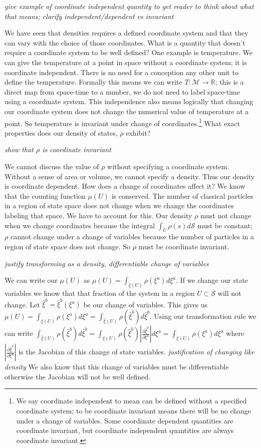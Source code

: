 \documentclass{article}
\begin{document}
\emph{give example of coordinate independent quantity to get reader to think about what that means; clarify independent/dependent vs invariant}

	We have seen that densities requires a defined coordinate system and that they can vary with the choice of those coordinates. What is a quantity that doesn't require a coordinate system to be well defined? One example is temperature. We can give the temperature at a point in space without a coordinate system; it is coordinate independent. There is no need for a conception any other unit to define the temperature. Formally this means we can write $T : \mathcal{M} \to \mathbb{R}$; this is a direct map from space-time to a number, we do not need to label space-time using a coordinate system. This independence also means logically that changing our coordinate system does not change the numerical value of temperature at a point. So temperature is invariant under change of coordinates.\footnote{We say coordinate independent to mean can be defined without a specified coordinate system; to be coordinate invariant means there will be no change under a change of variables. Some coordinate dependent quantities are coordinate invariant, but coordinate independent quantities are always coordinate invariant.} What exact properties does our density of states, $\rho$ exhibit?

	\emph{show that $\rho$ is coordinate invariant}
	
	We cannot discuss the value of $\rho$ without specifying a coordinate system. Without a sense of area or volume, we cannot specify a density. Thus our density is coordinate dependent. How does a change of coordinates affect it? We know that the counting function $\mu(U)$ is conserved. The number of classical particles in a region of state space does not change when we change the coordinates labeling that space. We have to account for this. Our density $\rho$ must not change when we change coordinates because the integral $\int_U \rho(s) d\mathcal{S}$ must be constant; $\rho$ cannot change under a change of variables because the number of particles in a region of state space does not change. So $\rho$ must be coordinate invariant.
	
	\emph{justify transforming as a density, differentiable change of variables}

	We can write our $\mu(U)$ as $\mu(U) = \int_{\xi(U)} \rho(\xi^a)d\xi^a$. If we change our state variables we know that that fraction of the system in a region $U \subset \mathcal{S}$ will not change. Let $\hat{\xi}^b = \hat{\xi}^b(\xi^a)$ be our change of variables. This gives us $\mu(U) = \int_{\xi(U)} \rho(\xi^a)d\xi^a = \int_{\hat{\xi}(U)} \rho(\hat{\xi}^b)d\hat{\xi}^b$. Using our transformation rule we can write $\int_{\hat{\xi}(U)} \rho(\hat{\xi}^b)d\hat{\xi}^b = \int_{\xi(U)} \rho(\hat{\xi}^b)\left|\frac{\partial\hat{\xi}^b}{\partial\xi^a}\right|d\xi^a = \int_{\xi(U)} \rho(\xi^a)d\xi^a$ where $\left|\frac{\partial\hat{\xi}^b}{\partial\xi^a}\right|$ is the Jacobian of this change of state variables. \emph{justification of changing like density} We also know that this change of variables must be differentiable otherwise the Jacobian will not be well defined.
	
\end{document}
